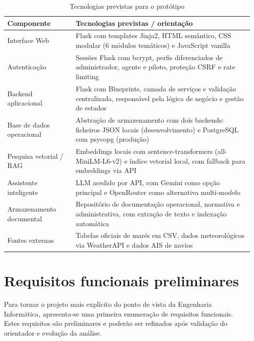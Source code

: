 \documentclass[a4paper,12pt]{report}
\begin{document}
\begin{table}[H]
\centering
\caption{Tecnologias previstas para o protótipo}
\label{tab:tecnologias}
\begin{tabular}{>{\raggedright\arraybackslash}p{4.2cm} >{\raggedright\arraybackslash}p{9.8cm}}
\toprule
\textbf{Componente} & \textbf{Tecnologias previstas / orientação} \\
\midrule
Interface Web & Flask com templates Jinja2, HTML semântico, CSS modular (6 módulos temáticos) e JavaScript vanilla \\
Autenticação & Sessões Flask com bcrypt, perfis diferenciados de administrador, agente e piloto, proteção CSRF e rate limiting \\
Backend aplicacional & Flask com Blueprints, camada de serviços e validação centralizada, responsável pela lógica de negócio e gestão de estados \\
Base de dados operacional & Abstração de armazenamento com dois backends: ficheiros JSON locais (desenvolvimento) e PostgreSQL com psycopg (produção) \\
Pesquisa vetorial / RAG & Embeddings locais com sentence-transformers (all-MiniLM-L6-v2) e índice vetorial local, com fallback para embeddings via API \\
Assistente inteligente & LLM acedido por API, com Gemini como opção principal e OpenRouter como alternativa multi-modelo \\
Armazenamento documental & Repositório de documentação operacional, normativa e administrativa, com extração de texto e indexação automática \\
Fontes externas & Tabelas oficiais de marés em CSV, dados meteorológicos via WeatherAPI e dados AIS de navios \\
\bottomrule
\end{tabular}
\end{table}

\section{Requisitos funcionais preliminares}

Para tornar o projeto mais explícito do ponto de vista da Engenharia Informática, apresenta-se uma primeira enumeração de requisitos funcionais. Estes requisitos são preliminares e poderão ser refinados após validação do orientador e evolução da análise.
\end{document}
